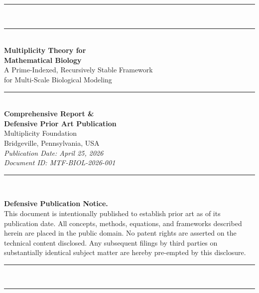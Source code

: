 \documentclass[12pt,letterpaper]{article}
\begin{document}
\begin{titlepage}
\centering
\vspace*{1.5cm}

{\color{mtblue}\rule{\linewidth}{1.5pt}}\\[0.4em]
{\color{mtblue}\rule{\linewidth}{0.4pt}}\\[1.5em]

{\Huge\bfseries\color{mtblue}
Multiplicity Theory for\\[0.3em]Mathematical Biology}\\[1em]

{\Large\color{mtgray}
A Prime-Indexed, Recursively Stable Framework\\
for Multi-Scale Biological Modeling}\\[2em]

{\large\color{mtblue}\rule{0.6\linewidth}{0.4pt}}\\[1em]

{\large
\textbf{Comprehensive Report \&}\\
\textbf{Defensive Prior Art Publication}\\[1.5em]
\textcolor{mtgray}{Multiplicity Foundation}\\
\textcolor{mtgray}{Bridgeville, Pennsylvania, USA}\\[1em]
\textcolor{mtgray}{\textit{Publication Date: April 25, 2026}}\\
\textcolor{mtgray}{\textit{Document ID: MTF-BIOL-2026-001}}
}\\[2em]

{\color{mtblue}\rule{0.6\linewidth}{0.4pt}}\\[2em]

\begin{tcolorbox}[colback=mtblue!6,colframe=mtblue!50,width=0.85\linewidth]
\centering\small
\textbf{Defensive Publication Notice.}\\
This document is intentionally published to establish prior art as of its
publication date. All concepts, methods, equations, and frameworks described
herein are placed in the public domain. No patent rights are asserted on the
technical content disclosed. Any subsequent filings by third parties on
substantially identical subject matter are hereby pre-empted by this disclosure.
\end{tcolorbox}

\vfill
{\color{mtblue}\rule{\linewidth}{0.4pt}}\\[0.3em]
{\color{mtblue}\rule{\linewidth}{1.5pt}}
\end{titlepage}
\end{document}
